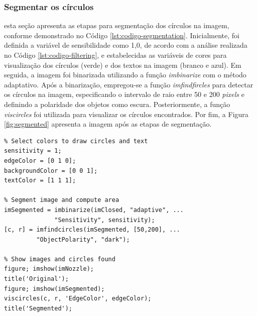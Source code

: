\documentclass[conference]{IEEEtran}
\begin{document}
\subsubsection{Segmentar os círculos} esta seção apresenta as etapas para segmentação dos círculos na imagem, conforme demonstrado no Código \ref{lst:codigo-segmentation}. Inicialmente, foi definida a variável de sensibilidade como 1,0, de acordo com a análise realizada no Código \ref{lst:codigo-filtering}, e estabelecidas as variáveis de cores para visualização dos círculos (verde) e dos textos na imagem (branco e azul). Em seguida, a imagem foi binarizada utilizando a função \textit{imbinarize} com o método adaptativo. Após a binarização, empregou-se a função \textit{imfindfircles} para detectar os círculos na imagem, especificando o intervalo de raio entre 50 e 200 \textit{pixels} e definindo a polaridade dos objetos como escura. Posteriormente, a função \textit{viscircles} foi utilizada para visualizar os círculos encontrados. Por fim, a Figura \ref{fig:segmented} apresenta a imagem após as etapas de segmentação.

\begin{lstlisting}[caption={Segmentação dos círculos escuros}, label={lst:codigo-segmentation}]
% Select sensitivity to segmentation 
% Select colors to draw circles and text
sensitivity = 1;
edgeColor = [0 1 0];
backgroundColor = [0 0 1];
textColor = [1 1 1];

% Segment image and compute area
imSegmented = imbinarize(imClosed, "adaptive", ...
		      "Sensitivity", sensitivity); 
[c, r] = imfindcircles(imSegmented, [50,200], ...
  	  	 "ObjectPolarity", "dark");

% Show images and circles found
figure; imshow(imNozzle);
title('Original');
figure; imshow(imSegmented);  
viscircles(c, r, 'EdgeColor', edgeColor);
title('Segmented');
\end{lstlisting}
\end{document}
